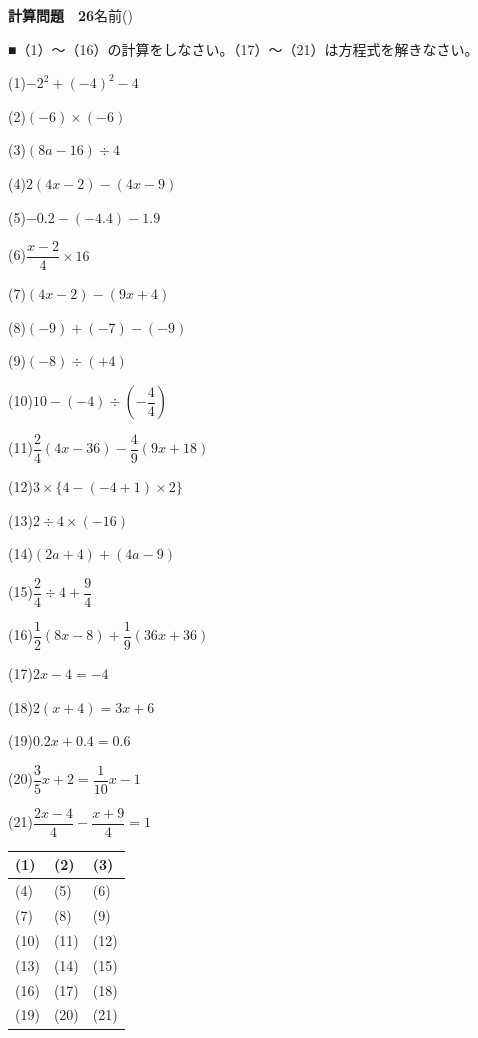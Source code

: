 \documentclass[a4paper,11pt]{ltjsarticle}
\newlength{\qcol}\setlength{\qcol}{0.47\textwidth}
\newlength{\qgap}
\newlength{\anscolw}\setlength{\anscolw}{0.30\textwidth}
\newlength{\ansh}
\newcommand{\Q}[2]{\parbox[t]{\qcol}{\raggedright (#1)\hspace{0.6em}$\displaystyle #2$}}
\newcommand{\QR}[4]{\Q{#1}{#2}\hfill\Q{#3}{#4}\par\vspace{\qgap}}
\newcommand{\anscell}[1]{\rule[-\ansdrop]{0pt}{\ansh}(#1)}
\newlength{\ansdrop}
\begin{document}
{\large\bfseries 計算問題　26}\hfill 名前(\underline{\hspace{32mm}})\par\vspace{3mm}
■（1）〜（16）の計算をしなさい。（17）〜（21）は方程式を解きなさい。\par\vspace{3mm}
\setlength{\qgap}{5.4mm}
\QR{1}{-2^2+(-4)^2-4}{2}{(-6)\times(-6)}
\QR{3}{(8a-16)\div4}{4}{2(4x-2)-(4x-9)}
\QR{5}{-0.2-(-4.4)-1.9}{6}{\dfrac{x-2}{4}\times16}
\QR{7}{(4x-2)-(9x+4)}{8}{(-9)+(-7)-(-9)}
\QR{9}{(-8)\div(+4)}{10}{10-(-4)\div\left(-\dfrac{4}{4}\right)}
\QR{11}{\dfrac{2}{4}(4x-36)-\dfrac{4}{9}(9x+18)}{12}{3\times\{4-(-4+1)\times2\}}
\QR{13}{2\div4\times(-16)}{14}{(2a+4)+(4a-9)}
\QR{15}{\dfrac{2}{4}\div4+\dfrac{9}{4}}{16}{\dfrac{1}{2}(8x-8)+\dfrac{1}{9}(36x+36)}
\QR{17}{2x-4=-4}{18}{2(x+4)=3x+6}
\QR{19}{0.2x+0.4=0.6}{20}{\dfrac{3}{5}x+2=\dfrac{1}{10}x-1}
\vspace{1mm}
\Q{21}{\dfrac{2x-4}{4}-\dfrac{x+9}{4}=1}\par\vspace{3mm}
\setlength{\ansh}{9.5mm}\setlength{\ansdrop}{6mm}%
\begin{center}\begin{tabular}{|p{\anscolw}|p{\anscolw}|p{\anscolw}|}\hline
\anscell{1} & \anscell{2} & \anscell{3} \\\hline
\anscell{4} & \anscell{5} & \anscell{6} \\\hline
\anscell{7} & \anscell{8} & \anscell{9} \\\hline
\anscell{10} & \anscell{11} & \anscell{12} \\\hline
\anscell{13} & \anscell{14} & \anscell{15} \\\hline
\anscell{16} & \anscell{17} & \anscell{18} \\\hline
\anscell{19} & \anscell{20} & \anscell{21} \\\hline
\end{tabular}\end{center}
\end{document}
